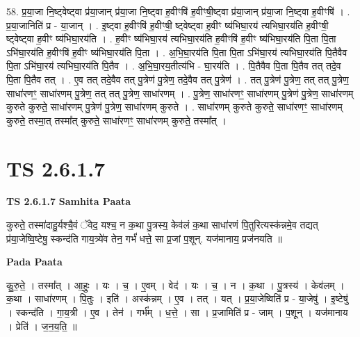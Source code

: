 \documentclass[17pt]{extarticle}
\begin{document}
58. प्र॒या॒जा नि॒ष्ट्वेष्ट्वा प्र॑या॒जान् प्र॑या॒जा नि॒ष्ट्वा ह॒वीꣳषि॑ ह॒वीꣳषी॒ष्ट्वा प्र॑या॒जान् प्र॑या॒जा नि॒ष्ट्वा ह॒वीꣳषि॑ । . प्र॒या॒जानिति॑ प्र - या॒जान् । . इ॒ष्ट्वा ह॒वीꣳषि॑ ह॒वीꣳषी॒ ष्ट्वेष्ट्वा ह॒वीꣳ ष्य॑भिघा॒रय॑ त्यभिघा॒रय॑ति ह॒वीꣳषी॒ ष्ट्वेष्ट्वा 
ह॒वीꣳ ष्य॑भिघा॒रय॑ति । . ह॒वीꣳ ष्य॑भिघा॒रय॑ त्यभिघा॒रय॑ति ह॒वीꣳषि॑ ह॒वीꣳ ष्य॑भिघा॒रय॑ति पि॒ता पि॒ता ऽभि॑घा॒रय॑ति ह॒वीꣳषि॑ ह॒वीꣳ ष्य॑भिघा॒रय॑ति पि॒ता । . अ॒भि॒घा॒रय॑ति पि॒ता पि॒ता ऽभि॑घा॒रय॑ त्यभिघा॒रय॑ति पि॒तैवैव पि॒ता ऽभि॑घा॒रय॑ त्यभिघा॒रय॑ति पि॒तैव । . अ॒भि॒घा॒रय॒तीत्य॑भि - घा॒रय॑ति । . पि॒तैवैव पि॒ता पि॒तैव तत् तदे॒व पि॒ता पि॒तैव तत् । . ए॒व तत् तदे॒वैव तत् पु॒त्रेण॑ पु॒त्रेण॒ तदे॒वैव तत् पु॒त्रेण॑ । . तत् पु॒त्रेण॑ पु॒त्रेण॒ तत् तत् पु॒त्रेण॒ साधा॑रणꣳ॒॒ साधा॑रणम् पु॒त्रेण॒ तत् तत् पु॒त्रेण॒ साधा॑रणम् । . पु॒त्रेण॒ साधा॑रणꣳ॒॒ साधा॑रणम् पु॒त्रेण॑ पु॒त्रेण॒ साधा॑रणम् कुरुते कुरुते॒ साधा॑रणम् पु॒त्रेण॑ पु॒त्रेण॒ साधा॑रणम् कुरुते । . साधा॑रणम् कुरुते कुरुते॒ साधा॑रणꣳ॒॒ साधा॑रणम् कुरुते॒ तस्मा॒त् तस्मा᳚त् कुरुते॒ साधा॑रणꣳ॒॒ साधा॑रणम् कुरुते॒ तस्मा᳚त् । \newline
\pagebreak
{}
\section*{ TS 2.6.1.7 }

\textbf{TS 2.6.1.7 } \newline
\textbf{Samhita Paata} \newline

कुरुते॒ तस्मा॑दाहु॒र्यश्चै॒वं ॅवेद॒ यश्च॒ न क॒था पु॒त्रस्य॒ केव॑लं क॒था साधा॑रणं पि॒तुरित्यस्क॑न्नमे॒व तद्यत् प्र॑या॒जेष्वि॒ष्टेषु॒ स्कन्द॑ति गाय॒त्र्ये॑व तेन॒ गर्भं॑ धत्ते॒ सा प्र॒जां प॒शून्. यज॑मानाय॒ प्रज॑नयति ॥ \newline

\textbf{Pada Paata} \newline

कु॒रु॒ते॒ । तस्मा᳚त् । आ॒हुः॒ । यः । च॒ । ए॒वम् । वेद॑ । यः । च॒ । न । क॒था । पु॒त्रस्य॑ । केव॑लम् । क॒था । साधा॑रणम् । पि॒तुः । इति॑ । अस्क॑न्नम् । ए॒व । तत् । यत् । प्र॒या॒जेष्विति॑ प्र - या॒जेषु॑ । इ॒ष्टेषु॑ । स्कन्द॑ति । गा॒य॒त्री । ए॒व । तेन॑ । गर्भ᳚म् । ध॒त्ते॒ । सा । प्र॒जामिति॑ प्र - जाम् । प॒शून् । यज॑मानाय । प्रेति॑ । ज॒न॒य॒ति॒ ॥  \newline
\end{document}
